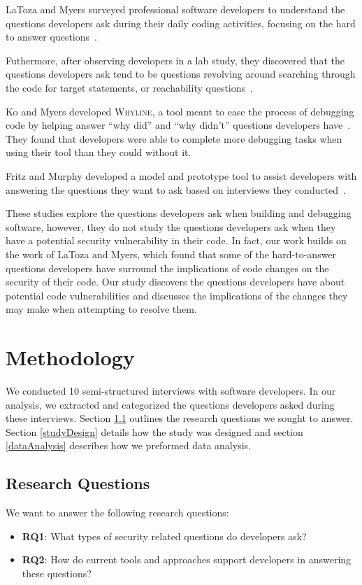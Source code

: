 \documentclass[conference]{IEEEtran}
\begin{document}
LaToza and Myers surveyed professional software developers to understand the questions developers ask during their daily coding activities, focusing on the hard to answer questions~\cite{latoza2010hard}. 

Futhermore, after observing developers in a lab study, they discovered that the questions developers ask tend to be questions revolving around searching through the code for target statements, or reachability questions~\cite{latoza2010developers}. 

Ko and Myers developed \textsc{Whyline}, a tool meant to ease the process of debugging code by helping answer ``why did'' and ``why didn't'' questions developers have~\cite{ko2004designing}. They found that developers were able to complete more debugging tasks when using their tool than they could without it.

Fritz and Murphy developed a model and prototype tool to assist developers with answering the questions they want to ask based on interviews they conducted~\cite{fritz2010using}.


These studies explore the questions developers ask when building and debugging software, however, they do not study the questions developers ask when they have a potential security vulnerability in their code. 
In fact, our work builds on the work of LaToza and Myers, which found that some of the hard-to-answer questions developers have surround the implications of code changes on the security of their code. 
Our study discovers the questions developers have about potential code vulnerabilities and discusses the implications of the changes they may make when attempting to resolve them. 

\section{Methodology}
\label{sec:meth}
We conducted 10 semi-structured interviews with software developers. In our analysis, we extracted and categorized the questions developers asked during these interviews. 
Section \ref{rqs} outlines the research questions we sought to answer. 
Section \ref{studyDesign} details how the study was designed and section \ref{dataAnalysis} describes how we preformed data analysis.


\subsection{Research Questions}
\label{rqs}
We want to answer the following research questions:
\begin{itemize}
\item \textbf{RQ1}: What types of security related questions do developers ask?
\item \textbf{RQ2}: How do current tools and approaches support developers in answering these questions?
\end{itemize}
\end{document}
